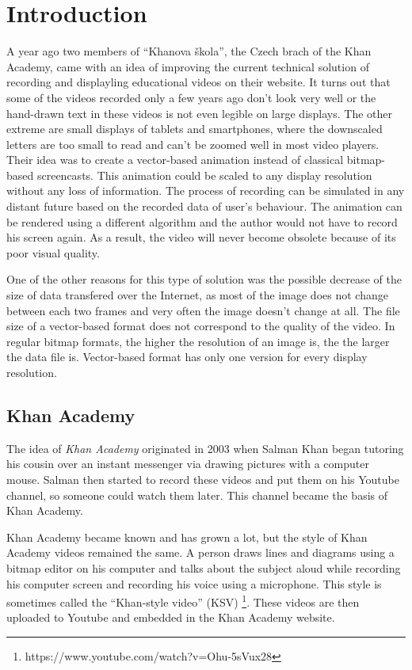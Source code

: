 \chapter*{Introduction}
A year ago two members of ``Khanova škola'', the Czech brach of the Khan Academy, came with an idea of improving the current technical solution of recording and displayling educational videos on their website. It turns out that some of the videos recorded only a few years ago don't look very well or the hand-drawn text in these videos is not even legible on large displays. The other extreme are small displays of tablets and smartphones, where the downscaled letters are too small to read and can't be zoomed well in most video players. Their idea was to create a vector-based animation instead of classical bitmap-based screencasts. This animation could be scaled to any display resolution without any loss of information. The process of recording can be simulated in any distant future based on the recorded data of user's behaviour. The animation can be rendered using a different algorithm and the author would not have to record his screen again. As a result, the video will never become obsolete because of its poor visual quality.

One of the other reasons for this type of solution was the possible decrease of the size of data transfered over the Internet, as most of the image does not change between each two frames and very often the image doesn't change at all. The file size of a vector-based format does not correspond to the quality of the video. In regular bitmap formats, the higher the resolution of an image is, the the larger the data file is. Vector-based format has only one version for every display resolution.

\section*{Khan Academy}
\label{sec:khan-academy}
The idea of \textit{Khan Academy} originated in 2003 when Salman Khan began tutoring his cousin over an instant messenger via drawing pictures with a computer mouse. Salman then started to record these videos and put them on his Youtube channel, so someone could watch them later. This channel became the basis of Khan Academy.

Khan Academy became known and has grown a lot, but the style of Khan Academy videos remained the same. A person draws lines and diagrams using a bitmap editor on his computer and talks about the subject aloud while recording his computer screen and recording his voice using a microphone. This style is sometimes called the ``Khan-style video'' (KSV) \footnote{https://www.youtube.com/watch?v=Ohu-5sVux28}. These videos are then uploaded to Youtube and embedded in the Khan Academy website.

